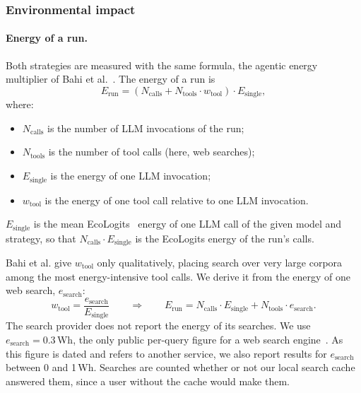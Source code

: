
\subsubsection{Environmental impact}

\paragraph{Energy of a run.}
Both strategies are measured with the same formula, the agentic energy multiplier of Bahi et
al.~\cite{bahi2026environmental}. The energy of a run is
\[
E_{\text{run}} = \left(N_{\text{calls}} + N_{\text{tools}} \cdot w_{\text{tool}}\right) \cdot E_{\text{single}},
\]
where:
\begin{itemize}
\item $N_{\text{calls}}$ is the number of LLM invocations of the run;
\item $N_{\text{tools}}$ is the number of tool calls (here, web searches);
\item $E_{\text{single}}$ is the energy of one LLM invocation;
\item $w_{\text{tool}}$ is the energy of one tool call relative to one LLM invocation.
\end{itemize}
$E_{\text{single}}$ is the mean EcoLogits~\cite{ecologits} energy of one LLM call of the given model and strategy, so
that $N_{\text{calls}} \cdot E_{\text{single}}$ is the EcoLogits energy of the run's calls.

Bahi et al. give $w_{\text{tool}}$ only qualitatively, placing search over very large corpora among the most
energy-intensive tool calls. We derive it from the energy of one web search, $e_{\text{search}}$:
\[
w_{\text{tool}} = \frac{e_{\text{search}}}{E_{\text{single}}}
\qquad\Longrightarrow\qquad
E_{\text{run}} = N_{\text{calls}} \cdot E_{\text{single}} + N_{\text{tools}} \cdot e_{\text{search}} .
\]
The search provider does not report the energy of its searches. We use $e_{\text{search}} = 0.3$\,Wh, the only public
per-query figure for a web search engine~\cite{google2009search}. As this figure is dated and refers to another
service, we also report results for $e_{\text{search}}$ between 0 and 1\,Wh. Searches are counted whether or not our
local search cache answered them, since a user without the cache would make them.

